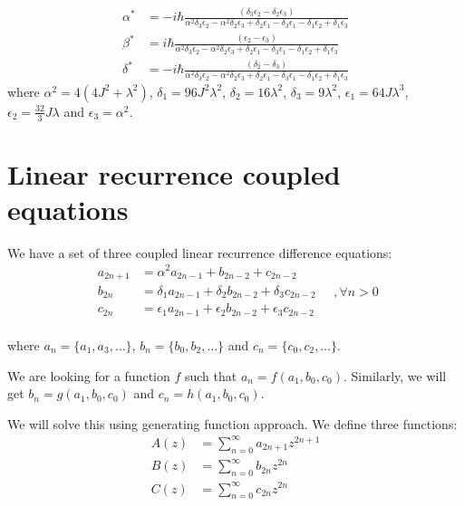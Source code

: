 \documentclass[11pt,a4paper]{article}
\begin{document}
\begin{align}
\alpha^* &= - i \hbar \frac{  \left(\delta _3 \epsilon _2-\delta _2 \epsilon _3\right)}{\alpha ^2 \delta _3 \epsilon _2-\alpha ^2 \delta _2 \epsilon _3+\delta
   _2 \epsilon _1-\delta _3 \epsilon _1-\delta _1 \epsilon _2+\delta _1 \epsilon _3} \\
  \beta^* &= i \hbar \frac{ \left(\epsilon _2-\epsilon _3\right) }{\alpha ^2 \delta _3 \epsilon _2-\alpha ^2 \delta _2 \epsilon _3+\delta _2 \epsilon
   _1-\delta _3 \epsilon _1-\delta _1 \epsilon _2+\delta _1 \epsilon _3} \\
 \delta^*  &=- i \hbar \frac{ \left(\delta _2-\delta _3\right) }{\alpha ^2 \delta _3 \epsilon _2-\alpha ^2 \delta _2 \epsilon _3+\delta _2 \epsilon _1-\delta
   _3 \epsilon _1-\delta _1 \epsilon _2+\delta _1 \epsilon _3}
\end{align}
where  $\alpha^2= 4 (4 J^2 +  \lambda ^2) $, $\delta_1= 96 J^2 \lambda^2$, $\delta_2= 16 \lambda^2$, $\delta_3= 9 \lambda^2$, $\epsilon_1= 64 J \lambda^3$, $\epsilon_2= \frac{32}{3} J \lambda$ and $\epsilon_3= \alpha^2$.
\appendix

\section{Linear recurrence coupled equations}
We have a set of three coupled linear recurrence difference equations:
\begin{equation}
\boxed{
\begin{aligned}
a_{2n+1}&= \alpha^2 a_{2n-1} + b_{2n-2} + c_{2n-2} \\
b_{2n}&= \delta_1 a_{2n-1} + \delta_2 b_{2n-2} + \delta_3 c_{2n-2} \\
c_{2n} &= \epsilon_1 a_{2n-1} + \epsilon_2 b_{2n-2} + \epsilon_3 c_{2n-2}\\
\end{aligned}}
\quad , \forall n >0
\end{equation}

where $a_n= \{a_1, a_3, \ldots\}$, $b_n= \{b_0, b_2, \ldots\}$ and $c_n= \{c_0, c_2, \ldots\}$.

We are looking for a function $f$ such that $a_n= f(a_1, b_0,c_0)$. Similarly, we will get $b_n= g(a_1, b_0,c_0)$ and $c_n= h(a_1, b_0,c_0)$.

We will solve this using generating function approach. We define three functions:
\begin{align}
A(z)&= \sum_{n=0}^{\infty} a_{2n+1}z^{2n+1}\\
 B(z)&= \sum_{n=0}^{\infty} b_{2n}z^{2n}\\
C(z)&= \sum_{n=0}^{\infty} c_{2n}z^{2n}
\end{align}
\end{document}
